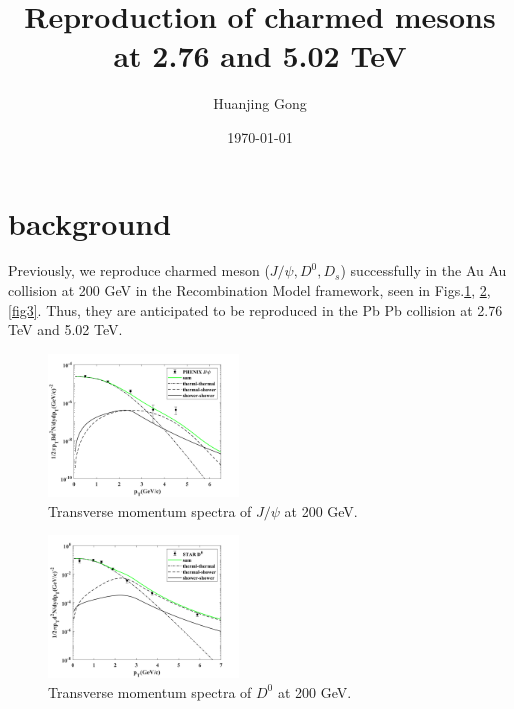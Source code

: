 \documentclass[twocolumn,aps,superscriptaddress,nofootinbib,floatfix]{revtex4}
\begin{document}
	
	\title{Reproduction of charmed mesons at 2.76 and 5.02 TeV}
	
	\author{Huanjing Gong}
	
	\date{\today}
	
	
	\pacs{}
	\keywords{}
	\maketitle
	
\section{background}
	Previously, we reproduce charmed meson ($J/\psi, D^0, D_s$) successfully in the Au Au collision at 200 GeV  in the Recombination Model framework, seen in Figs.\ref{fig1}, \ref{fig2}, \ref{fig3}.
	Thus, they are anticipated to be reproduced in the Pb Pb collision at 2.76 TeV and 5.02 TeV.
	\begin{figure}[pht]
		\includegraphics[width=0.45\textwidth]{Jpsi_200GeV.png}
		\caption{Transverse momentum spectra of $J/\psi$ at 200 GeV.}
		\label{fig1}
	\end{figure}
	\begin{figure}[pht]
	\includegraphics[width=0.45\textwidth]{D0_200GeV.png}
	\caption{Transverse momentum spectra of $D^0$ at 200 GeV.}
	\label{fig2}
	\end{figure}
\end{document}
